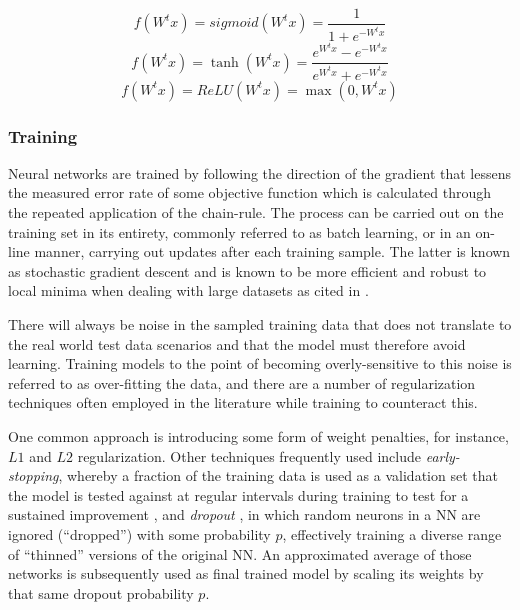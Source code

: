 \documentclass[../../fyp.tex]{subfiles}
\begin{document}
\begin{equation} \label{eq:sigmoid}
	f(W^tx) = sigmoid(W^tx) = \frac{1}{1+e^{-W^tx}}
\end{equation}
\begin{equation} \label{eq:hyperbolic_tangent}
	f(W^tx) = \tanh(W^tx) = \frac{e^{W^tx}-e^{-W^tx}}{e^{W^tx}+e^{-W^tx}}
\end{equation}
\begin{equation} \label{eq:relu}
	f(W^tx) = ReLU(W^tx) = \max(0,W^tx)
\end{equation}

\subsubsection{Training}
Neural networks are trained by following the direction of the gradient that lessens the measured error rate of some objective function which is calculated through the repeated application of the chain-rule. The process can be carried out on the training set in its entirety, commonly referred to as batch learning, or in an on-line manner, carrying out updates after each training sample. The latter is known as stochastic gradient descent and is known to be more efficient and robust to local minima when dealing with large datasets \cite{lecun1998} as cited in \cite{graves2012b}.

There will always be noise in the sampled training data that does not translate to the real world test data scenarios and that the model must therefore avoid learning. Training models to the point of becoming overly-sensitive to this noise is referred to as over-fitting the data, and there are a number of regularization techniques often employed in the literature while training to counteract this.

One common approach is introducing some form of weight penalties, for instance, $L1$ and $L2$ regularization. Other techniques frequently used include \textit{early-stopping}, whereby a fraction of the training data is used as a validation set that the model is tested against at regular intervals during training to test for a sustained improvement \cite{graves2012}, and \textit{dropout} \cite{srivastava2014}, in which random neurons in a NN are ignored (\enquote{dropped}) with some probability $p$, effectively training a diverse range of \enquote{thinned} versions of the original NN. An approximated average of those networks is subsequently used as final trained model by scaling its weights by that same dropout probability $p$.
\end{document}
